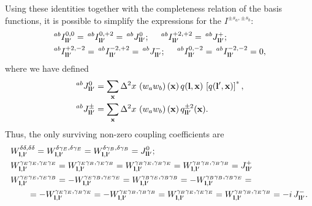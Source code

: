 \documentclass[a4paper,11pt]{article}
\newcommand{\summ}[1]{\sum_{\bf #1}\Delta^2 #1\,}
\begin{document}
      Using these identities together with the completeness relation of the basis functions, it is possible to simplify the expressions for the $I^{\pm s_a,\pm s_b}$:
      \begin{align}
        &\,^{ab}I^{0,0}_{{\bf l}{\bf l}'}=\,^{ab}I^{0,+2}_{{\bf l}{\bf l}'}=\,^{ab}J^0_{{\bf l}{\bf l}'}; \hspace{12pt}
        \,^{ab}I^{+2,+2}_{{\bf l}{\bf l}'}=\,^{ab}J^+_{{\bf l}{\bf l}'};\\
        &\,^{ab}I^{+2,-2}_{{\bf l}{\bf l}'}=\,^{ab}I^{-2,+2}_{{\bf l}{\bf l}'}=\,^{ab}J^-_{{\bf l}{\bf l}'}; \hspace{12pt}
        \,^{ab}I^{0,-2}_{{\bf l}{\bf l}'}=\,^{ab}I^{-2,-2}_{{\bf l}{\bf l}'}=0,
      \end{align}
      where  we have defined
      \begin{align}\label{eq:covar_coupling_J}
        &\,^{ab}J^0_{{\bf l}{\bf l}'}=\summ{x}\left(w_a w_b\right)({\bf x})\,q({\bf l},{\bf x})\,\left[q({\bf l}',{\bf x})\right]^*,\\
        &\,^{ab}J^\pm_{{\bf l}{\bf l}'}=\summ{x}\left(w_a w_b\right)({\bf x})\,q^{\pm2}_{{\bf l}{\bf l}'}({\bf x}).
      \end{align}
      Thus, the only surviving non-zero coupling coefficients are
      \begin{align}
        &W^{\delta\delta,\delta\delta}_{{\bf l},{\bf l}'}=W^{\delta\gamma_E,\delta\gamma_E}_{{\bf l},{\bf l}'}=W^{\delta\gamma_B,\delta\gamma_B}_{{\bf l},{\bf l}'}=J^0_{{\bf l}{\bf l}'};\\
        &W^{\gamma_E\gamma_E,\gamma_E\gamma_E}_{{\bf l},{\bf l}'}=W^{\gamma_E\gamma_B,\gamma_E\gamma_B}_{{\bf l},{\bf l}'}=W^{\gamma_B\gamma_E,\gamma_B\gamma_E}_{{\bf l},{\bf l}'}=W^{\gamma_B\gamma_B,\gamma_B\gamma_B}_{{\bf l},{\bf l}'}=J^+_{{\bf l}{\bf l}'}\\\nonumber
        &W^{\gamma_E\gamma_E,\gamma_E\gamma_B}_{{\bf l},{\bf l}'}=-W^{\gamma_E\gamma_B,\gamma_E\gamma_E}_{{\bf l},{\bf l}'}=W^{\gamma_B\gamma_E,\gamma_B\gamma_B}_{{\bf l},{\bf l}'}=-W^{\gamma_B\gamma_B,\gamma_B\gamma_E}_{{\bf l},{\bf l}'}=\\
        &\hspace{20pt}=-W^{\gamma_E\gamma_E,\gamma_B\gamma_E}_{{\bf l},{\bf l}'}=-W^{\gamma_E\gamma_B,\gamma_B\gamma_B}_{{\bf l},{\bf l}'}=W^{\gamma_B\gamma_E,\gamma_E\gamma_E}_{{\bf l},{\bf l}'}=W^{\gamma_B\gamma_B,\gamma_E\gamma_B}_{{\bf l},{\bf l}'}=-i\,J^-_{{\bf l}{\bf l}'}.
      \end{align}
    
\end{document}
